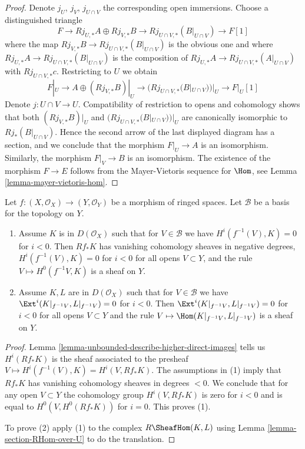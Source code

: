 \begin{proof}
Denote $j_U$, $j_V$, $j_{U \cap V}$ the corresponding open immersions.
Choose a distinguished triangle
$$
F \to Rj_{U, *}A \oplus Rj_{V, *}B \to Rj_{U \cap V, *}(B|_{U \cap V})
\to F[1]
$$
where the map $Rj_{V, *}B \to Rj_{U \cap V, *}(B|_{U \cap V})$ is the
obvious one and where
$Rj_{U, *}A \to Rj_{U \cap V, *}(B|_{U \cap V})$
is the composition of
$Rj_{U, *}A \to Rj_{U \cap V, *}(A|_{U \cap V})$
with $Rj_{U \cap V, *}c$. Restricting to $U$ we obtain
$$
F|_U \to A \oplus (Rj_{V, *}B)|_U \to (Rj_{U \cap V, *}(B|_{U \cap V}))|_U
\to F|_U[1]
$$
Denote $j : U \cap V \to U$. Compatibility of restriction to opens and
cohomology shows that both
$(Rj_{V, *}B)|_U$ and $(Rj_{U \cap V, *}(B|_{U \cap V}))|_U$
are canonically isomorphic to $Rj_*(B|_{U \cap V})$.
Hence the second arrow of the last displayed diagram has
a section, and we conclude that the morphism $F|_U \to A$ is
an isomorphism. Similarly, the morphism $F|_V \to B$ is an
isomorphism. The existence of the morphism $F \to E$ follows
from the Mayer-Vietoris sequence for $\Hom$, see
Lemma \ref{lemma-mayer-vietoris-hom}.
\end{proof}

\begin{lemma}
\label{lemma-vanishing-and-glueing}
Let $f : (X, \mathcal{O}_X) \to (Y, \mathcal{O}_Y)$ be a morphism
of ringed spaces. Let $\mathcal{B}$ be a basis for the topology on $Y$.
\begin{enumerate}
\item Assume $K$ is in $D(\mathcal{O}_X)$ such that
for $V \in \mathcal{B}$ we have $H^i(f^{-1}(V), K) = 0$ for $i < 0$.
Then $Rf_*K$ has vanishing cohomology sheaves in negative degrees,
$H^i(f^{-1}(V), K) = 0$ for $i < 0$ for all opens $V \subset Y$, and
the rule $V \mapsto H^0(f^{-1}V, K)$ is a sheaf on $Y$.
\item Assume $K, L$ are in $D(\mathcal{O}_X)$ such that
for $V \in \mathcal{B}$ we have
$\Ext^i(K|_{f^{-1}V}, L|_{f^{-1}V}) = 0$ for $i < 0$.
Then $\Ext^i(K|_{f^{-1}V}, L|_{f^{-1}V}) = 0$ for $i < 0$
for all opens $V \subset Y$ and
the rule $V \mapsto \Hom(K|_{f^{-1}V}, L|_{f^{-1}V})$ is a sheaf on $Y$.
\end{enumerate}
\end{lemma}

\begin{proof}
Lemma \ref{lemma-unbounded-describe-higher-direct-images} tells us
$H^i(Rf_*K)$ is the sheaf associated to the presheaf
$V \mapsto H^i(f^{-1}(V), K) = H^i(V, Rf_*K)$.
The assumptions in (1) imply that $Rf_*K$ has vanishing cohomology
sheaves in degrees $< 0$. We conclude that for any open $V \subset Y$
the cohomology group $H^i(V, Rf_*K)$ is zero for $i < 0$ and is equal to
$H^0(V, H^0(Rf_*K))$ for $i = 0$. This proves (1).

\medskip\noindent
To prove (2) apply (1) to the complex $R\SheafHom(K, L)$ using
Lemma \ref{lemma-section-RHom-over-U} to do the translation.
\end{proof}

